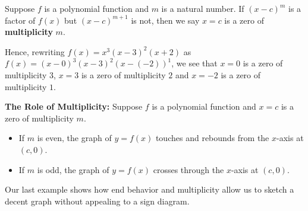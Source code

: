 \smallskip

\colorbox{ResultColor}{\bbm

\begin{defn} \label{multiplicity} Suppose $f$ is a polynomial function and $m$ is a natural number. If $(x-c)^{m}$ is a factor of $f(x)$ but $(x-c)^{m+1}$ is not, then we say $x=c$ is a zero of \textbf{multiplicity} $m$.

\end{defn}

\ebm}

\smallskip

Hence,  rewriting  $f(x) = x^3 (x-3)^2 (x+2)$ as $f(x) = (x-0)^3 (x-3)^2 (x-(-2))^{1}$, we see that $x=0$ is a zero of multiplicity $3$, $x=3$ is a zero of multiplicity $2$ and $x=-2$ is a zero of multiplicity $1$.

\smallskip

\colorbox{ResultColor}{\bbm

\begin{thm} \label{roleofmultiplicity} \textbf{The Role of Multiplicity:}  Suppose $f$ is a polynomial function  and $x=c$ is a zero of multiplicity $m$.  

\begin{itemize}

\item  If $m$ is even, the graph of $y=f(x)$ touches and rebounds from the $x$-axis at $(c,0)$.

\item  If $m$ is odd, the graph of $y=f(x)$ crosses through the $x$-axis at $(c,0)$.

\end{itemize}

\end{thm}

\ebm}

\medskip

Our last example shows how end behavior and multiplicity allow us to sketch a decent graph without appealing to a sign diagram.

